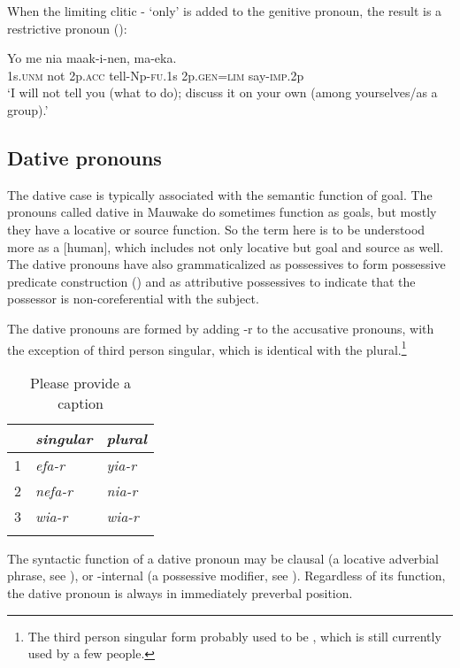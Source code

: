 When the limiting clitic - `only' is added to the genitive pronoun, the result is a restrictive pronoun ():

\ea%
\label{ex:3:x604}
\gll Yo me nia maak-i-nen,  ma-eka. \\
1s.\textsc{unm} not 2p.\textsc{acc} tell-Np-\textsc{fu}.1s 2p.\textsc{gen}=\textsc{lim} say-\textsc{imp}.2p\\
\glt`I will not tell you (what to do); discuss it on your own (among yourselves/as a group).'
\z

\subsection{Dative pronouns}\label{sec:3.5.5}
{}
The dative case is typically associated with the semantic function of goal. The pronouns called dative in Mauwake do sometimes function as goals, but mostly they have a locative or source function. So the term here is to be understood more as a [\textstyleEmphasizedWords{{+}}human]\textstyleEmphasizedWords{ }, which includes not only locative but goal and source as well. The dative pronouns have also grammaticalized as possessives to form possessive predicate construction () and as attributive possessives to indicate that the possessor is non-coreferential with the subject. 

The dative pronouns are formed by adding -r to the accusative pronouns, with the exception of third person singular, which is identical with the plural.\footnote{The third person singular form probably used to be , which is still currently used by a few people.}

\begin{table}
\caption{Please provide a caption}
\label{} 
\begin{tabular}{l>{\itshape}l>{\itshape}l}
\mytoprule
 &\upshape singular &\upshape plural\\
\midrule
1 &efa-r &yia-r\\
2 &nefa-r &nia-r\\
3 &wia-r &wia-r\\
\mybottomrule
\end{tabular}
\end{table}


The syntactic function of a dative pronoun may be clausal (a locative adverbial phrase, see ), or -internal (a possessive modifier, see ). Regardless of its function, the dative pronoun is always in immediately preverbal position. 

